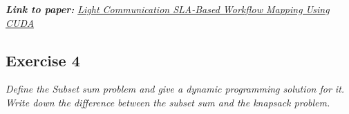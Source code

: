 \documentclass[12pt]{article}
\begin{document}
\textit{\textbf{Link to paper:} \hyperlink{https://ieeexplore.ieee.org/abstract/document/5282978}{Light Communication SLA-Based Workflow Mapping Using CUDA}}

\newpage

\subsection*{Exercise 4}
\textit{Define the Subset sum problem and give a dynamic programming solution for
it. Write down the difference between the subset sum and the knapsack problem.}\newline
\end{document}
